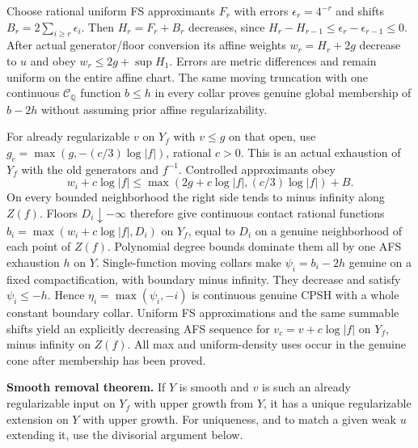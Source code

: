 \documentclass[
  10pt,
]{article}
\begin{document}
Choose rational uniform FS approximants \(F_r\) with errors
\(\epsilon_r=4^{-r}\) and shifts \(B_r=2\sum_{i\ge r}\epsilon_i\). Then
\(H_r=F_r+B_r\) decreases, since
\(H_r-H_{r-1}\le\epsilon_r-\epsilon_{r-1}\le0\). After actual
generator/floor conversion its affine weights \(w_r=H_r+2g\) decrease to
\(u\) and obey \(w_r\le2g+\sup H_1\). Errors are metric differences and
remain uniform on the entire affine chart. The same moving truncation
with one continuous \(\mathcal C_{\mathbb Q}\) function \(b\le h\) in
every collar proves genuine global membership of \(b-2h\) without
assuming prior affine regularizability.

For already regularizable \(v\) on \(Y_f\) with \(v\le g\) on that open,
use \(g_c=\max(g,-(c/3)\log|f|)\), rational \(c>0\). This is an actual
exhaustion of \(Y_f\) with the old generators and \(f^{-1}\). Controlled
approximants obey
\[w_i+c\log|f|\le\max(2g+c\log|f|,(c/3)\log|f|)+B. \tag{20}\] On every
bounded neighborhood the right side tends to minus infinity along
\(Z(f)\). Floors \(D_i\downarrow-\infty\) therefore give continuous
contact rational functions \(b_i=\max(w_i+c\log|f|,D_i)\) on \(Y_f\),
equal to \(D_i\) on a genuine neighborhood of each point of \(Z(f)\).
Polynomial degree bounds dominate them all by one AFS exhaustion \(h\)
on \(Y\). Single-function moving collars make \(\psi_i=b_i-2h\) genuine
on a fixed compactification, with boundary minus infinity. They decrease
and satisfy \(\psi_i\le-h\). Hence \(\eta_i=\max(\psi_i,-i)\) is
continuous genuine CPSH with a whole constant boundary collar. Uniform
FS approximations and the same summable shifts yield an explicitly
decreasing AFS sequence for \(v_c=v+c\log|f|\) on \(Y_f\), minus
infinity on \(Z(f)\). All max and uniform-density uses occur in the
genuine cone after membership has been proved.

\textbf{Smooth removal theorem.} If \(Y\) is smooth and \(v\) is such an
already regularizable input on \(Y_f\) with upper growth from \(Y\), it
has a unique regularizable extension on \(Y\) with upper growth. For
uniqueness, and to match a given weak \(u\) extending it, use the
divisorial argument below.
\end{document}
